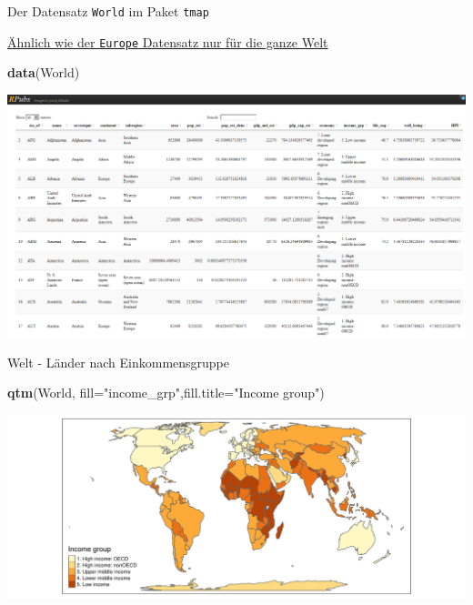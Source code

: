 \documentclass[ignorenonframetext,]{beamer}
\newenvironment{Shaded}{\begin{snugshade}}{\end{snugshade}}
\newcommand{\DataTypeTok}[1]{\textcolor[rgb]{0.13,0.29,0.53}{#1}}
\newcommand{\KeywordTok}[1]{\textcolor[rgb]{0.13,0.29,0.53}{\textbf{#1}}}
\newcommand{\NormalTok}[1]{#1}
\newcommand{\StringTok}[1]{\textcolor[rgb]{0.31,0.60,0.02}{#1}}
\begin{document}
\begin{frame}[fragile]{Der Datensatz \texttt{World} im Paket
\texttt{tmap}}
\protect\hypertarget{der-datensatz-world-im-paket-tmap}{}

\begin{block}{\href{http://rpubs.com/Japhilko82/tmap_World}{Ähnlich wie
der \texttt{Europe} Datensatz nur für die ganze Welt}}

\begin{Shaded}
\begin{Highlighting}[]
\KeywordTok{data}\NormalTok{(World)}
\end{Highlighting}
\end{Shaded}

\includegraphics{figure/tmap_world.PNG}

\end{block}

\end{frame}

\begin{frame}[fragile]{Welt - Länder nach Einkommensgruppe}
\protect\hypertarget{welt---lander-nach-einkommensgruppe}{}

\begin{Shaded}
\begin{Highlighting}[]
\KeywordTok{qtm}\NormalTok{(World, }\DataTypeTok{fill=}\StringTok{"income_grp"}\NormalTok{,}\DataTypeTok{fill.title=}\StringTok{"Income group"}\NormalTok{) }
\end{Highlighting}
\end{Shaded}

\includegraphics{A4_tmap_files/figure-beamer/unnamed-chunk-26-1.pdf}

\end{frame}
\end{document}
